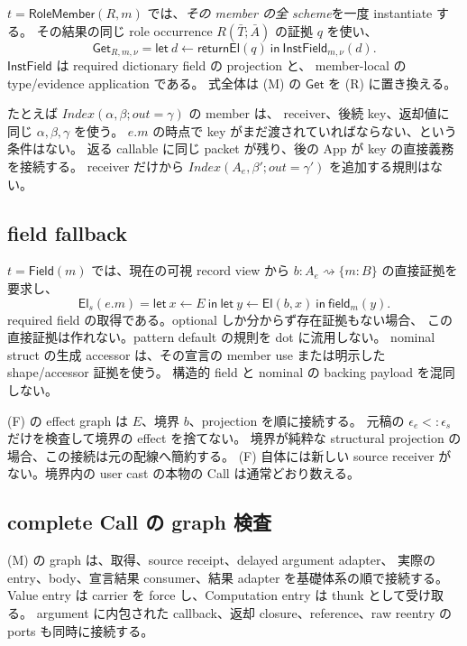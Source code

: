 \documentclass[11pt,a4paper]{article}
\newcommand{\Ret}{\mathsf{return}}
\newcommand{\El}{\mathsf{El}}
\newcommand{\Dir}{\mathrel{\rightsquigarrow}}
\begin{document}
\(t=\mathsf{RoleMember}(R,m)\) では、\emph{その member の全 scheme}を一度 instantiate する。
その結果の同じ role occurrence \(R(\bar T;\bar A)\) の証拠 \(q\) を使い、
\[
 \mathsf{Get}_{R,m,\nu}=
 \mathsf{let}\ d\leftarrow\Ret\El(q)\ \mathsf{in}\
 \mathsf{InstField}_{m,\nu}(d).
 \tag{R}
\]
\(\mathsf{InstField}\) は required dictionary field の projection と、
member-local の type/evidence application である。
式全体は (M) の \(\mathsf{Get}\) を (R) に置き換える。

たとえば \(Index(\alpha,\beta;out=\gamma)\) の member は、
receiver、後続 key、返却値に同じ \(\alpha,\beta,\gamma\) を使う。
\(e.m\) の時点で key がまだ渡されていればならない、という条件はない。
返る callable に同じ packet が残り、後の App が key の直接義務を接続する。
receiver だけから \(Index(A_e,\beta';out=\gamma')\) を追加する規則はない。

\subsection{field fallback}

\(t=\mathsf{Field}(m)\) では、現在の可視 record view から
\(b:A_e\Dir\{m:B\}\) の直接証拠を要求し、
\[
 \El_s(e.m)=
 \mathsf{let}\ x\leftarrow E\ \mathsf{in}\
 \mathsf{let}\ y\leftarrow\El(b,x)\ \mathsf{in}\
 \mathsf{field}_m(y).
 \tag{F}
\]
required field の取得である。optional しか分からず存在証拠もない場合、
この直接証拠は作れない。pattern default の規則を dot に流用しない。
nominal struct の生成 accessor は、その宣言の member use または明示した shape/accessor 証拠を使う。
構造的 field と nominal の backing payload を混同しない。

(F) の effect graph は \(E\)、境界 \(b\)、projection を順に接続する。
元稿の \(\epsilon_e<:\epsilon_s\) だけを検査して境界の effect を捨てない。
境界が純粋な structural projection の場合、この接続は元の配線へ簡約する。
(F) 自体には新しい source receiver がない。境界内の user cast の本物の Call は通常どおり数える。

\subsection{complete Call の graph 検査}

(M) の graph は、取得、source receipt、delayed argument adapter、
実際の entry、body、宣言結果 consumer、結果 adapter を基礎体系の順で接続する。
Value entry は carrier を force し、Computation entry は thunk として受け取る。
argument に内包された callback、返却 closure、reference、raw reentry の ports も同時に接続する。
\end{document}
